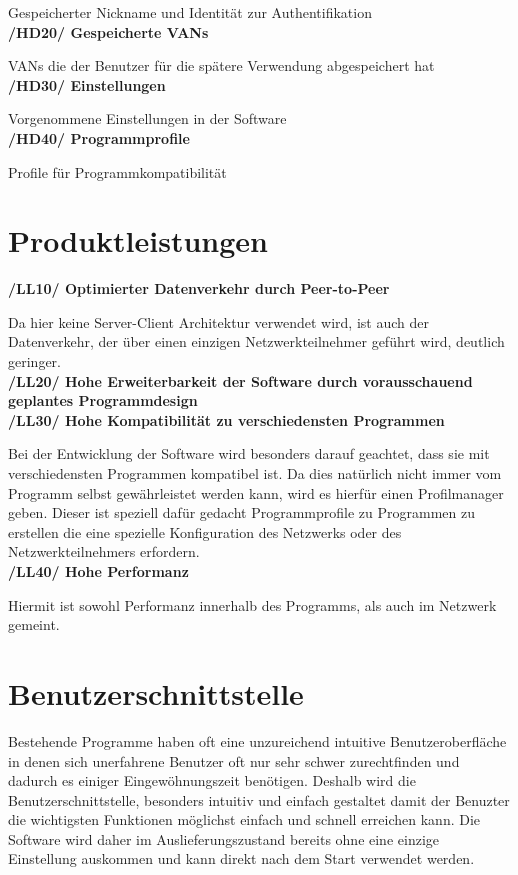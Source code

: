 \documentclass[a4paper,12pt]{scrreprt}
\begin{document}
	Gespeicherter Nickname und Identität zur Authentifikation\\
	\textbf {/HD20/ Gespeicherte VANs}
	
	VANs die der Benutzer für die spätere Verwendung abgespeichert hat\\
	\textbf {/HD30/ Einstellungen}
	
	Vorgenommene Einstellungen in der Software\\
	\textbf {/HD40/ Programmprofile}
	
	Profile für Programmkompatibilität

\chapter{Produktleistungen}
	\textbf{/LL10/ Optimierter Datenverkehr durch Peer-to-Peer}
	
		Da hier keine Server-Client Architektur verwendet wird, ist auch der Datenverkehr, der über einen einzigen Netzwerkteilnehmer geführt wird, deutlich geringer.\\
	\textbf{/LL20/ Hohe Erweiterbarkeit der Software durch vorausschauend geplantes Programmdesign}
	\\\textbf{/LL30/ Hohe Kompatibilität zu verschiedensten Programmen}
	
		Bei der Entwicklung der Software wird besonders darauf geachtet, dass sie mit verschiedensten Programmen kompatibel ist. Da dies natürlich nicht immer vom Programm selbst gewährleistet werden kann, wird es hierfür einen Profilmanager geben. Dieser ist speziell dafür gedacht Programmprofile zu Programmen zu erstellen die eine spezielle Konfiguration des Netzwerks oder des Netzwerkteilnehmers erfordern.
	\\\textbf{/LL40/ Hohe Performanz}
	
		Hiermit ist sowohl Performanz innerhalb des Programms, als auch im Netzwerk gemeint.
	
	
	
	
\chapter{Benutzerschnittstelle}
	Bestehende Programme haben oft eine unzureichend intuitive Benutzeroberfläche in denen sich unerfahrene Benutzer oft nur sehr schwer zurechtfinden und dadurch es einiger Eingewöhnungszeit benötigen. Deshalb wird die Benutzerschnittstelle, besonders intuitiv und einfach gestaltet damit der Benuzter die wichtigsten Funktionen möglichst einfach und schnell erreichen kann. Die Software wird daher im Auslieferungszustand bereits ohne eine einzige Einstellung auskommen und kann direkt nach dem Start verwendet werden.
	
\end{document}
